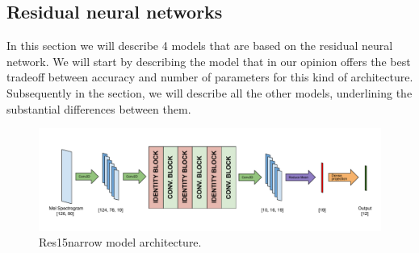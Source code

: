   
\subsection{Residual neural networks}
In this section we will describe 4 models that are based on the residual neural network.
We will start by describing the model that in our opinion offers the best tradeoff between accuracy and number of parameters for this kind of architecture.
Subsequently in the section, we will describe all the other models, underlining the substantial differences between them.

\begin{figure}[htbp]
\centerline{\includegraphics[scale=.6]{res.pdf}}
\caption{Res15narrow model architecture.}
\label{fig}
\end{figure}

